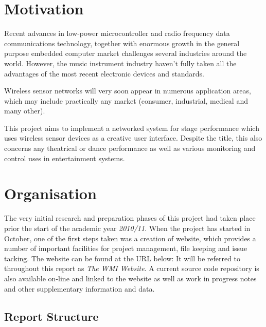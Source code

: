 \section{Motivation}

  Recent advances in low-power microcontroller and radio frequency data communications
 technology, together with enormous growth in the general purpose embedded computer
 market challenges several industries around the world. However, the music instrument
 industry haven't fully taken all the advantages of the most recent electronic devices
 and standards.
 
 Wireless sensor networks will very soon appear in numerous application areas,
 which may include practically any market (consumer, industrial, medical and many other).
 
 This project aims to implement a networked system for stage performance which uses
 wireless sensor devices as a creative user interface. Despite the title, this also
 concerns any theatrical or dance performance as well as various monitoring and
 control uses in entertainment systems.

\section{Organisation}

  The very initial research and preparation phases of this project had taken place
 prior the start of the academic year \emph{2010/11}. When the project has started
 in October, one of the first steps taken was a creation of website, which provides
 a number of important facilities for project management, file keeping and issue
 tacking. The website can be found at the URL below:
 {}
 It will be referred to throughout this report as \emph{The WMI Website}. A current
 source code repository is also available on-line and linked to the website as well
 as work in progress notes and other supplementary information and data.

\subsection{Report Structure}
